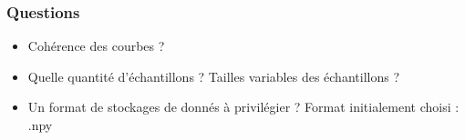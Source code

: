 \documentclass{beamer}
\begin{document}
\begin{frame}
  \frametitle{Questions}
  \begin{itemize}
    \item Cohérence des courbes ?
    \item Quelle quantité d'échantillons ? Tailles variables des échantillons ?
    \item Un format de stockages de donnés à privilégier ? Format initialement choisi : .npy
  \end{itemize}
\end{frame}

\end{document}
